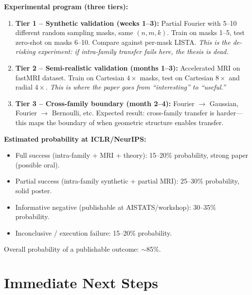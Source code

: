 \documentclass[11pt]{article}
\begin{document}
\textbf{Experimental program (three tiers):}
\begin{enumerate}[leftmargin=2em]
    \item \textbf{Tier 1 -- Synthetic validation (weeks 1--3):}
    Partial Fourier with 5--10 different random sampling masks,
    same $(n, m, k)$. Train on masks 1--5, test zero-shot on
    masks 6--10. Compare against per-mask LISTA.
    \textit{This is the de-risking experiment: if intra-family
    transfer fails here, the thesis is dead.}

    \item \textbf{Tier 2 -- Semi-realistic validation (months 1--3):}
    Accelerated MRI on fastMRI dataset. Train on Cartesian $4\times$
    masks, test on Cartesian $8\times$ and radial $4\times$.
    \textit{This is where the paper goes from ``interesting'' to
    ``useful.''}

    \item \textbf{Tier 3 -- Cross-family boundary (month 2--4):}
    Fourier $\to$ Gaussian, Fourier $\to$ Bernoulli, etc.
    Expected result: cross-family transfer is harder---this maps
    the boundary of when geometric structure enables transfer.
\end{enumerate}

\textbf{Estimated probability at ICLR/NeurIPS:}
\begin{itemize}[leftmargin=2em]
    \item Full success (intra-family + MRI + theory): 15--20\%
    probability, strong paper (possible oral).
    \item Partial success (intra-family synthetic + partial MRI):
    25--30\% probability, solid poster.
    \item Informative negative (publishable at AISTATS/workshop):
    30--35\% probability.
    \item Inconclusive / execution failure: 15--20\% probability.
\end{itemize}

Overall probability of a publishable outcome: $\sim$85\%.

\section{Immediate Next Steps}
\label{sec:next}
\end{document}
